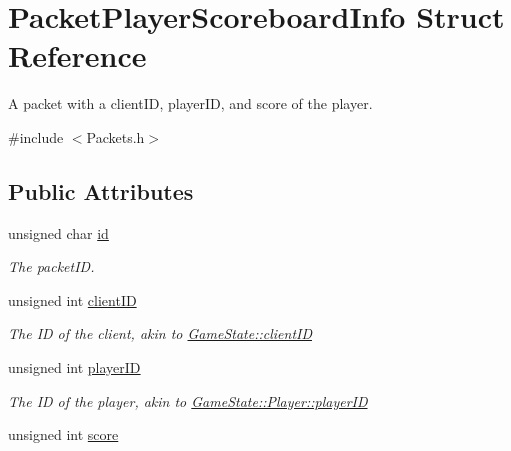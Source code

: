 \hypertarget{struct_packet_player_scoreboard_info}{\section{Packet\-Player\-Scoreboard\-Info Struct Reference}
\label{struct_packet_player_scoreboard_info}
}


A packet with a client\-I\-D, player\-I\-D, and score of the player.  




{\ttfamily \#include $<$Packets.\-h$>$}

\subsection*{Public Attributes}
\begin{DoxyCompactItemize}
\item 
\hypertarget{struct_packet_player_scoreboard_info_a57c4aeafb56667d32226fe2aacabb02b}{unsigned char \hyperlink{struct_packet_player_scoreboard_info_a57c4aeafb56667d32226fe2aacabb02b}{id}}\label{struct_packet_player_scoreboard_info_a57c4aeafb56667d32226fe2aacabb02b}

\begin{DoxyCompactList}\small\item\em The packet\-I\-D. \end{DoxyCompactList}\item 
\hypertarget{struct_packet_player_scoreboard_info_a1771129f213cfc2cb44e56ab54bee0a8}{unsigned int \hyperlink{struct_packet_player_scoreboard_info_a1771129f213cfc2cb44e56ab54bee0a8}{client\-I\-D}}\label{struct_packet_player_scoreboard_info_a1771129f213cfc2cb44e56ab54bee0a8}

\begin{DoxyCompactList}\small\item\em The I\-D of the client, akin to \hyperlink{class_game_state_ad24a423ba6655fc6541b2f12ce98e0d0}{Game\-State\-::client\-I\-D} \end{DoxyCompactList}\item 
\hypertarget{struct_packet_player_scoreboard_info_aaf646a832b6f674bcd54ceacc9592ae6}{unsigned int \hyperlink{struct_packet_player_scoreboard_info_aaf646a832b6f674bcd54ceacc9592ae6}{player\-I\-D}}\label{struct_packet_player_scoreboard_info_aaf646a832b6f674bcd54ceacc9592ae6}

\begin{DoxyCompactList}\small\item\em The I\-D of the player, akin to \hyperlink{class_game_state_1_1_player_acbd28d89e6eb8611aa66452ec31e9133}{Game\-State\-::\-Player\-::player\-I\-D} \end{DoxyCompactList}\item 
\hypertarget{struct_packet_player_scoreboard_info_a33431a8aad88714cda248283d7b5ba5a}{unsigned int \hyperlink{struct_packet_player_scoreboard_info_a33431a8aad88714cda248283d7b5ba5a}{score}}\label{struct_packet_player_scoreboard_info_a33431a8aad88714cda248283d7b5ba5a}


\end{DoxyCompactItemize}
